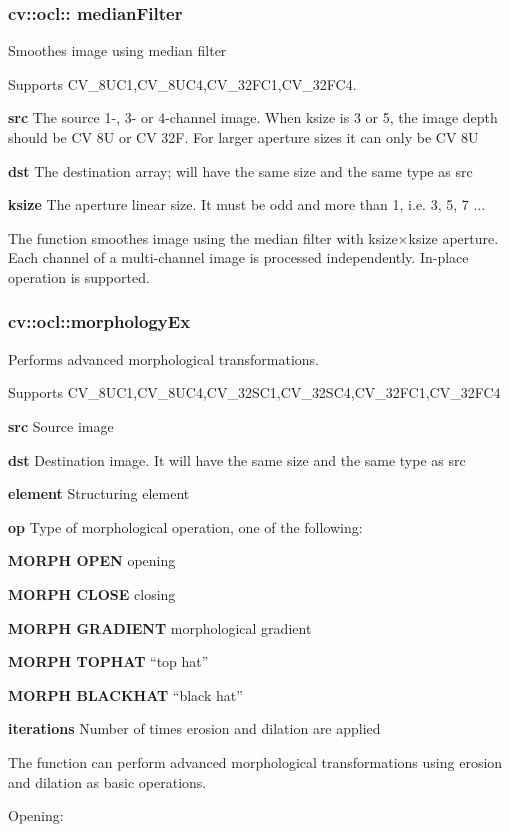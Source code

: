 \documentclass{article}
\begin{document}
\subsubsection{cv::ocl:: medianFilter}
\label{subsubsec:mylabel40}
Smoothes image using median filter

Supports CV{\_}8UC1,CV{\_}8UC4,CV{\_}32FC1,CV{\_}32FC4.

\textbf{src }The source 1-, 3- or 4-channel image. When ksize is 3 or 5, the
image depth should be CV 8U or CV 32F. For larger aperture sizes it
can only be CV 8U

\textbf{dst }The destination array; will have the same size and the same
type as src

\textbf{ksize }The aperture linear size. It must be odd and more than 1,
i.e. 3, 5, 7 ...

The function smoothes image using the median filter with ksize$\times $ksize
aperture. Each channel of a multi-channel image is processed independently.
In-place operation is supported.

\newpage

\subsubsection{cv::ocl::morphologyEx}
\label{subsubsec:mylabel41}
Performs advanced morphological transformations.

Supports CV{\_}8UC1,CV{\_}8UC4,CV{\_}32SC1,CV{\_}32SC4,CV{\_}32FC1,CV{\_}32FC4

\textbf{src }Source image

\textbf{dst }Destination image. It will have the same size and the same type
as src

\textbf{element }Structuring element

\textbf{op }Type of morphological operation, one of the following:

\textbf{MORPH OPEN }opening

\textbf{MORPH CLOSE }closing

\textbf{MORPH GRADIENT }morphological gradient

\textbf{MORPH TOPHAT }``top hat''

\textbf{MORPH BLACKHAT }``black hat''

\textbf{iterations }Number of times erosion and dilation are applied

The function can perform advanced morphological transformations using
erosion and dilation as basic operations.

Opening:
\end{document}
